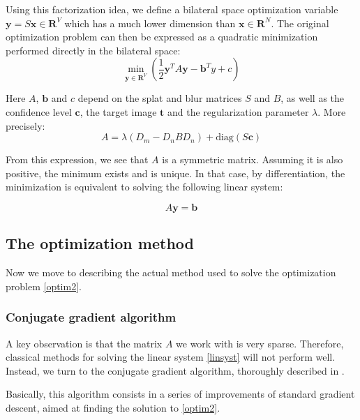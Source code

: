 \documentclass{article}
\begin{document}
\medskip

Using this factorization idea, we define a bilateral space optimization variable $\textbf{y} = S \textbf{x} \in \textbf{R}^V$ which has a much lower dimension than $\textbf{x} \in \textbf{R}^N$. The original optimization problem can then be expressed as a quadratic minimization performed directly in the bilateral space:
\begin{equation} \label{optim2}
    \min_{\textbf{y} \in \textbf{R}^V} \left( \frac{1}{2}\textbf{y}^T A \textbf{y} - \textbf{b}^T y + c \right)
\end{equation}

Here $A$, $\textbf{b}$ and $c$ depend on the splat and blur matrices $S$ and $B$, as well as the confidence level $\textbf{c}$, the target image $\textbf{t}$ and the regularization parameter $\lambda$. More precisely:
\begin{equation}
    A = \lambda (D_m - D_n B D_n) + \mathrm{diag}(S\textbf{c})
\end{equation}

From this expression, we see that $A$ is a symmetric matrix. Assuming it is also positive, the minimum exists and is unique.
In that case, by differentiation, the minimization is equivalent to solving the following linear system:

\begin{equation} \label{linsyst}
    A \textbf{y} = \textbf{b}
\end{equation}

\subsection{The optimization method}

Now we move to describing the actual method used to solve the optimization problem \eqref{optim2}.

\subsubsection{Conjugate gradient algorithm}

A key observation is that the matrix $A$ we work with is very sparse. Therefore, classical methods for solving the linear system \eqref{linsyst} will not perform well. Instead, we turn to the conjugate gradient algorithm, thoroughly described in \cite{shewchuk_introduction_1994}.

\medskip

Basically, this algorithm consists in a series of improvements of standard gradient descent, aimed at finding the solution to \eqref{optim2}.
\end{document}
